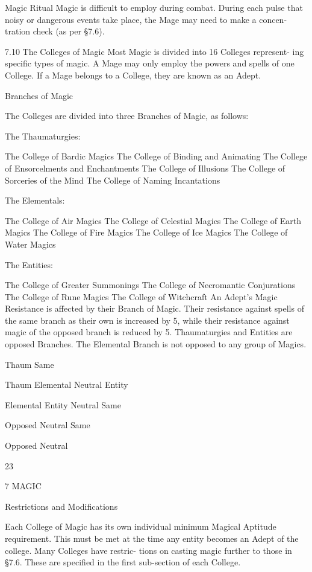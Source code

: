 \begin{Chapter}{Magic}
Ritual Magic is difficult to employ during combat. 
During  each  pulse  that  noisy  or  dangerous  events 
take place, the Mage may need to make a concen-
tration check (as per §7.6). 

7.10 The Colleges of Magic 
Most Magic is divided into 16 Colleges represent-
ing  specific  types  of  magic.  A  Mage  may  only 
employ  the  powers  and  spells  of  one  College.  If  a 
Mage  belongs  to  a  College,  they  are  known  as  an 
Adept. 

Branches of Magic 

The  Colleges  are  divided  into  three  Branches  of 
Magic, as follows: 

The Thaumaturgies: 

The College of Bardic Magics 
The College of Binding and Animating 
The College of Ensorcelments and Enchantments 
The College of Illusions 
The College of Sorceries of the Mind The College 
of Naming Incantations  

The Elementals: 

The College of Air Magics 
The College of Celestial Magics 
The College of Earth Magics 
The College of Fire Magics 
The College of Ice Magics 
The College of Water Magics 

The Entities: 

The College of Greater Summonings 
The College of Necromantic Conjurations 
The College of Rune Magics 
The College of Witchcraft 
An  Adept’s  Magic  Resistance  is  affected  by  their 
Branch of Magic. Their resistance against spells of 
the  same  branch  as  their  own  is  increased  by  5, 
while their resistance against magic of the opposed 
branch is reduced by 5. Thaumaturgies and Entities 
are  opposed  Branches.  The  Elemental  Branch  is 
not opposed to any group of Magics. 

Thaum 
Same 

 
Thaum 
Elemental  Neutral 
Entity 

Elemental  Entity 
Neutral 
Same 

Opposed 
Neutral  
Same 

Opposed  Neutral 

23 

7 MAGIC 

Restrictions and Modifications 

Each  College  of  Magic  has  its  own  individual 
minimum  Magical  Aptitude  requirement.  This 
must  be  met  at  the  time  any  entity  becomes  an 
Adept  of  the  college.  Many  Colleges  have  restric-
tions  on  casting  magic  further  to  those  in  §7.6. 
These are specified in the first sub-section of each 
College. 


\end{Chapter}
